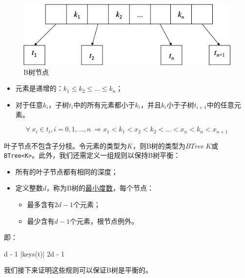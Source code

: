 \documentclass[b5paper]{ctexart}
\begin{document}
\begin{figure}[htbp]
  \centering
  \includegraphics[scale=0.5]{img/btree-node}
  \caption{B树节点}
  \label{fig:btree-node}
\end{figure}

\begin{itemize}
\item 元素是递增的：$k_1 \leq k_2 \leq ... \leq k_n$；
\item 对于任意$k_i$，子树$t_i$中的所有元素都小于$k_i$，并且$k_i$小于子树$t_{i+1}$中的任意元素。
\end{itemize}

\begin{equation}
\forall\ x_i \in t_i, i=0, 1, ..., n\ \Rightarrow x_1 < k_1 < x_2 < k_2 < ... < x_n < k_n < x_{n+1}
\label{eq:btree-order}
\end{equation}

叶子节点不包含子分枝。令元素的类型为$K$，则B树的类型为$BTree\ K$或\texttt{BTree<K>}。此外，我们还需定义一组规则以保持B树平衡：

\begin{itemize}
\item 所有的叶子节点都有相同的深度；
\item 定义整数$d$，称为B树的\underline{最小度数}，每个节点：
    \begin{itemize}
        \item 最多含有$2d - 1$个元素；
        \item 最少含有$d - 1$个元素，根节点例外。
    \end{itemize}
\end{itemize}

即：

\be
  d - 1 \leq |keys(t)|  \leq 2d - 1
\ee

我们接下来证明这些规则可以保证B树是平衡的。
\end{document}

